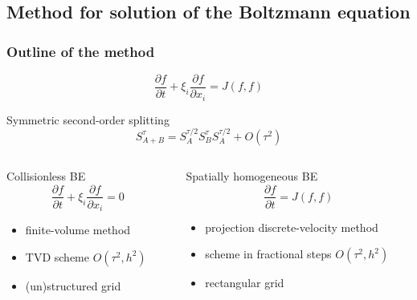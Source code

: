 \documentclass[mathserif]{beamer} %
\newcommand{\pder}[2][]{\frac{\partial#1}{\partial#2}}
\newcommand{\OO}[1]{O(#1)}
\begin{document}
\subsection{Method for solution of the Boltzmann equation}

\begin{frame}
    \frametitle{Outline of the method}
    \vspace{-5pt}
    \begin{equation}
        \pder[f]{t} + \xi_i\pder[f]{x_i} = J(f,f)
    \end{equation}
    \vspace{-10pt}
    \begin{block}{Symmetric second-order splitting}
        \begin{equation}
            S_{A+B}^{\tau} = S_A^{\tau/2}S_B^{\tau}S_A^{\tau/2} + \OO{\tau^2}
        \end{equation}
    \end{block}
    \pause
    \begin{columns}[T]
        \begin{column}{5cm}
            \begin{block}{Collisionless BE}
                \begin{equation}
                    \pder[f]{t} + \xi_i\pder[f]{x_i} = 0
                \end{equation}
                \vspace{-15pt}
                \begin{itemize}
                    \item finite-volume method
                    \item TVD scheme \(\OO{\tau^2, h^2}\)
                    \item (un)structured grid
                \end{itemize}
            \end{block}
        \end{column}
        \begin{column}{6.5cm}
            \begin{block}{Spatially homogeneous BE}
                \begin{equation}
                    \pder[f]{t} = J(f,f)
                \end{equation}
                \vspace{-15pt}
                \begin{itemize}
                    \item projection discrete-velocity method
                    \item scheme in fractional steps \(\OO{\tau^2, h^2}\)
                    \item rectangular grid
                \end{itemize}
            \end{block}
        \end{column}
    \end{columns}
\end{frame}
\end{document}
